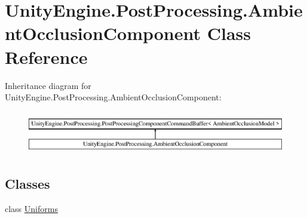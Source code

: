 \hypertarget{class_unity_engine_1_1_post_processing_1_1_ambient_occlusion_component}{}\section{Unity\+Engine.\+Post\+Processing.\+Ambient\+Occlusion\+Component Class Reference}
\label{class_unity_engine_1_1_post_processing_1_1_ambient_occlusion_component}
Inheritance diagram for Unity\+Engine.\+Post\+Processing.\+Ambient\+Occlusion\+Component\+:\begin{figure}[H]
\begin{center}
\leavevmode
\includegraphics[height=1.921098cm]{class_unity_engine_1_1_post_processing_1_1_ambient_occlusion_component}
\end{center}
\end{figure}
\subsection*{Classes}
\begin{DoxyCompactItemize}
\item 
class \hyperlink{class_unity_engine_1_1_post_processing_1_1_ambient_occlusion_component_1_1_uniforms}{Uniforms}
\end{DoxyCompactItemize}
